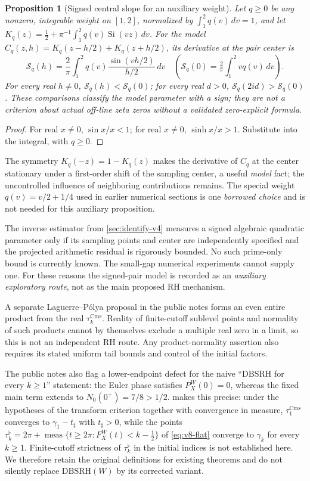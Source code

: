 \documentclass[11pt,a4paper]{article}
\numberwithin{equation}{section}
\newtheorem{proposition}[theorem]{Proposition}
\theoremstyle{definition}
\theoremstyle{remark}
\newcommand{\meas}{\operatorname{meas}}
\newcommand{\Cms}{\mathrm{Cms}}
\begin{document}
\begin{proposition}[Signed central slope for an auxiliary weight]
\label{prop:v7-signed-slope}
Let $q\ge0$ be any nonzero, integrable weight on $[1,2]$,
normalized by $\int_1^2q(v)\,dv=1$, and let
$K_q(z)=\frac12+\pi^{-1}\int_1^2q(v)\operatorname{Si}(vz)\,dv$.
For the \emph{model} $C_q(z,h)=K_q(z-h/2)+K_q(z+h/2)$,
its derivative at the pair center is
\begin{equation}
 \mathscr S_q(h)=\frac2\pi\int_1^2q(v)
 \frac{\sin(vh/2)}{h/2}\,dv
 \quad(\mathscr S_q(0)=\tfrac2\pi\int_1^2vq(v)\,dv).
\end{equation}
For every real $h\ne0$, $\mathscr S_q(h)<\mathscr S_q(0)$;
for every real $d>0$,
$\mathscr S_q(2id)>\mathscr S_q(0)$.
These comparisons classify the \emph{model} parameter with a
sign; they are not a criterion about actual off-line zeta
zeros without a validated zero-explicit formula.
\end{proposition}
\begin{proof}
For real $x\ne0$, $\sin x/x<1$; for real $x\ne0$,
$\sinh x/x>1$. Substitute into the integral, with $q\ge0$.
\end{proof}
The symmetry $K_q(-z)=1-K_q(z)$ makes the derivative of
$C_q$ at the center stationary under a first-order shift of
the sampling center, a useful \emph{model} fact; the
uncontrolled influence of neighboring contributions remains.
The special weight $q(v)=v/2+1/4$ used in earlier numerical
sections is one \emph{borrowed choice} and is not needed for
this auxiliary proposition.

The inverse estimator from \cref{sec:identify-v4} measures a
signed algebraic quadratic parameter only if its sampling
points and center are independently specified and the
projected arithmetic residual is rigorously bounded.
No such prime-only bound is currently known. The small-gap
numerical experiments cannot supply one. For these reasons
the signed-pair model is recorded as an \emph{auxiliary
exploratory route}, not as the main proposed RH mechanism.

A separate Laguerre--P\'olya proposal in the public notes
forms an even entire product from the real $\tau_k^{\Cms}$.
Reality of finite-cutoff sublevel points and normality of such
products cannot by themselves exclude a multiple real zero
in a limit, so this is not an independent RH route. Any
product-normality assertion also requires its stated uniform
tail bounds and control of the initial factors.

The public notes also flag a lower-endpoint defect
for the naive ``DBSRH for every $k\ge1$'' statement: the
Euler phase satisfies $P_X^W(0)=0$, whereas the fixed main
term extends to $N_0(0^+)=7/8>1/2$.  makes
this precise: under the hypotheses of the transform criterion
together with convergence in measure, $\tau_1^{\Cms}$ converges to
$\gamma_1-t_\sharp$ with $t_\sharp>0$, while the points
$\tau_k^\flat=2\pi+\meas\{t\ge2\pi:F_X^W(t)<k-\frac12\}$ of
\eqref{eq:v8-flat} converge to $\gamma_k$ for every $k\ge1$.
Finite-cutoff strictness of $\tau_k^\flat$ in the initial indices is
not established here. We therefore retain the original definitions
for existing theorems and do not silently replace
$\mathrm{DBSRH}(W)$ by its corrected variant.
\end{document}
